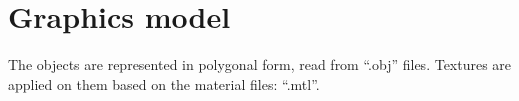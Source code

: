 \section{Graphics model}

The objects are represented in polygonal form, read from ``.obj'' files. Textures are applied on them based on the material files: ``.mtl''.
